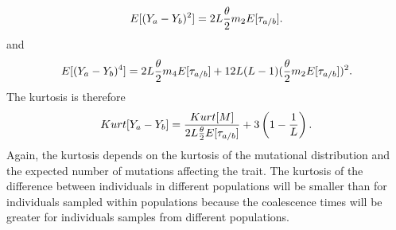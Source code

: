 \begin{equation}
  E[(Y_a-Y_b)^2]=2L\frac{\theta}{2} m_2 E[\tau_{a/b}].
\end{equation}
and
\begin{equation}
  E[(Y_a-Y_b)^4]=2L\frac{\theta}{2} m_4 E[\tau_{a/b}] + 12L(L-1)(\frac{\theta}{2} m_2 E[\tau_{a/b}])^2.
\end{equation}
The kurtosis is therefore
\begin{equation}
  \label{eq:diff_kurt}
  Kurt[Y_a-Y_b]=\frac{Kurt[M]}{2 L\frac{\theta}{2} E[\tau_{a/b}]} + 3\left(1-\frac{1}{L} \right).
\end{equation}
Again, the kurtosis depends on the kurtosis of the mutational distribution and
the expected number of mutations affecting the trait. The kurtosis of the
difference between individuals in different populations will be smaller than for
individuals sampled within populations because the coalescence times will be
greater for individuals samples from different populations.
